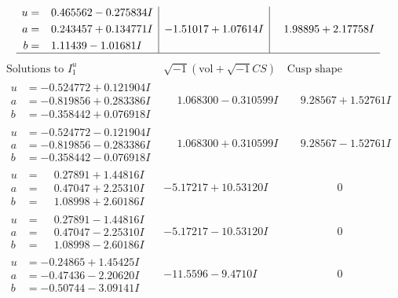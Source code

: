 \documentclass[1p]{elsarticle_modified}
\theoremstyle{definition}
\newcommand{\I}{\sqrt{-1}}
\begin{document}
$$\begin{array}{c|c|c}
\begin{aligned}
u &= \phantom{-}0.465562 - 0.275834 I \\
a &= \phantom{-}0.243457 + 0.134771 I \\
b &= \phantom{-}1.11439 - 1.01681 I\end{aligned}
 & -1.51017 + 1.07614 I & \phantom{-}1.98895 + 2.17758 I\\
 \hline 
 \end{array}$$\newpage$$\begin{array}{c|c|c}  
\text{Solutions to }I^u_{1}& \I (\text{vol} + \sqrt{-1}CS) & \text{Cusp shape}\\
 \hline 
\begin{aligned}
u &= -0.524772 + 0.121904 I \\
a &= -0.819856 + 0.283386 I \\
b &= -0.358442 + 0.076918 I\end{aligned}
 & \phantom{-}1.068300 - 0.310599 I & \phantom{-}9.28567 + 1.52761 I \\ \hline\begin{aligned}
u &= -0.524772 - 0.121904 I \\
a &= -0.819856 - 0.283386 I \\
b &= -0.358442 - 0.076918 I\end{aligned}
 & \phantom{-}1.068300 + 0.310599 I & \phantom{-}9.28567 - 1.52761 I \\ \hline\begin{aligned}
u &= \phantom{-}0.27891 + 1.44816 I \\
a &= \phantom{-}0.47047 + 2.25310 I \\
b &= \phantom{-}1.08998 + 2.60186 I\end{aligned}
 & -5.17217 + 10.53120 I & \phantom{-0.000000 } 0 \\ \hline\begin{aligned}
u &= \phantom{-}0.27891 - 1.44816 I \\
a &= \phantom{-}0.47047 - 2.25310 I \\
b &= \phantom{-}1.08998 - 2.60186 I\end{aligned}
 & -5.17217 - 10.53120 I & \phantom{-0.000000 } 0 \\ \hline\begin{aligned}
u &= -0.24865 + 1.45425 I \\
a &= -0.47436 - 2.20620 I \\
b &= -0.50744 - 3.09141 I\end{aligned}
 & -11.5596 - 9.4710 I & \phantom{-0.000000 } 0 \\ \hline\begin{aligned}

\end{aligned}
\end{array}$$
\end{document}
